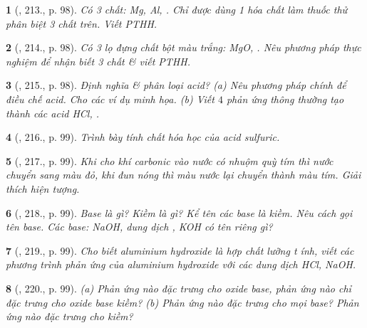 \documentclass{article}
\newtheorem{baitoan}{}
\begin{document}
\begin{baitoan}[\cite{Nguyen_Buu_Can_500_BT_Hoa_Hoc_THCS}, 213., p. 98]
	Có 3 chất: {\rm Mg, Al, }. Chỉ được dùng 1 hóa chất làm thuốc thử phân biệt 3 chất trên. Viết {\rm PTHH}.
\end{baitoan}

\begin{baitoan}[\cite{Nguyen_Buu_Can_500_BT_Hoa_Hoc_THCS}, 214., p. 98]
	Có 3 lọ đựng chất bột màu trắng: {\rm MgO, }. Nêu phương pháp thực nghiệm để nhận biết 3 chất \& viết {\rm PTHH}.
\end{baitoan}

\begin{baitoan}[\cite{Nguyen_Buu_Can_500_BT_Hoa_Hoc_THCS}, 215., p. 98]
	Định nghĩa \& phân loại acid? (a) Nêu phương pháp chính để điều chế acid. Cho các ví dụ minh họa. (b) Viết $4$ phản ứng thông thường tạo thành các acid {\rm HCl, }.
\end{baitoan}

\begin{baitoan}[\cite{Nguyen_Buu_Can_500_BT_Hoa_Hoc_THCS}, 216., p. 99]
	Trình bày tính chất hóa học của acid sulfuric.
\end{baitoan}

\begin{baitoan}[\cite{Nguyen_Buu_Can_500_BT_Hoa_Hoc_THCS}, 217., p. 99]
	Khi cho khí carbonic vào nước có nhuộm quỳ tím thì nước chuyển sang màu đỏ, khi đun nóng thì màu nước lại chuyển thành màu tím. Giải thích hiện tượng.
\end{baitoan}

\begin{baitoan}[\cite{Nguyen_Buu_Can_500_BT_Hoa_Hoc_THCS}, 218., p. 99]
	Base là gì? Kiềm là gì? Kể tên các base là kiềm. Nêu cách gọi tên base. Các base: {\rm NaOH}, dung dịch {\rm{}, KOH} có tên riêng gì?
\end{baitoan}

\begin{baitoan}[\cite{Nguyen_Buu_Can_500_BT_Hoa_Hoc_THCS}, 219., p. 99]
	Cho biết aluminium hydroxide là hợp chất lưỡng t ính, viết các phương trình phản ứng của aluminium hydroxide với các dung dịch {\rm HCl, NaOH}.
\end{baitoan}

\begin{baitoan}[\cite{Nguyen_Buu_Can_500_BT_Hoa_Hoc_THCS}, 220., p. 99]
	(a) Phản ứng nào đặc trưng cho oxide base, phản ứng nào chỉ đặc trưng cho oxide base kiềm? (b) Phản ứng nào đặc trưng cho mọi base? Phản ứng nào đặc trưng cho kiềm?
\end{baitoan}
\end{document}
